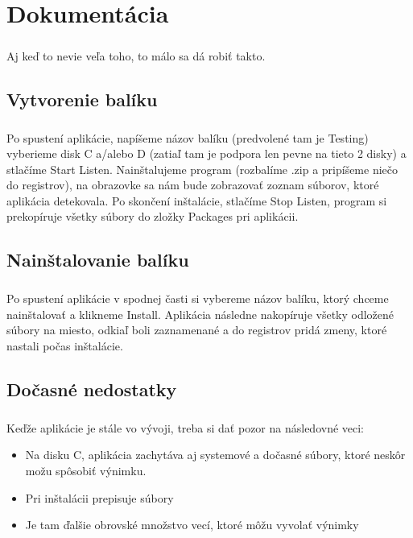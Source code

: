 \chapter{Dokumentácia}

\paragraph{}
Aj keď to nevie veľa toho, to málo sa dá robiť takto.

\section{Vytvorenie balíku}
\paragraph{}
Po spustení aplikácie, napíšeme názov balíku (predvolené tam je Testing) vyberieme disk C a/alebo D (zatiaľ tam je podpora len pevne na tieto 2 disky) a stlačíme Start Listen. Nainštalujeme program (rozbalíme .zip a pripíšeme niečo do registrov), na obrazovke sa nám bude zobrazovať zoznam súborov, ktoré aplikácia detekovala. Po skončení inštalácie, stlačíme Stop Listen, program si prekopíruje všetky súbory do zložky Packages pri aplikácii.

\section{Nainštalovanie balíku}
\paragraph{}
Po spustení aplikácie v spodnej časti si vybereme názov balíku, ktorý chceme nainštalovať a klikneme Install. Aplikácia následne nakopíruje všetky odložené súbory na miesto, odkiaľ boli zaznamenané a do registrov pridá zmeny, ktoré nastali počas inštalácie.

\section{Dočasné nedostatky}
\paragraph{}
Keďže aplikácie je stále vo vývoji, treba si dať pozor na následovné veci:
\begin{itemize}
\item Na disku C, aplikácia zachytáva aj systemové a dočasné súbory, ktoré neskôr možu spôsobiť výnimku.
\item Pri inštalácii prepisuje súbory
\item Je tam ďalšie obrovské množstvo vecí, ktoré môžu vyvolať výnimky
\end{itemize}